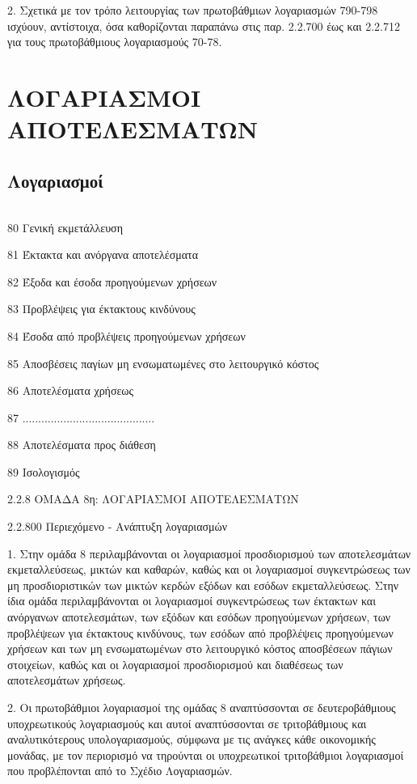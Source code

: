 \documentclass[A4,10pt,greek]{book}
\begin{document}
2. Σχετικά με τον τρόπο λειτουργίας των πρωτοβάθμιων λογαριασμών 790-798 ισχύουν, αντίστοιχα, όσα καθορίζονται παραπάνω στις παρ. 2.2.700 έως και 2.2.712 για τους πρωτοβάθμιους λογαριασμούς 70-78.

\chapter{ΛΟΓΑΡΙΑΣΜΟΙ ΑΠΟΤΕΛΕΣΜΑΤΩΝ}

\section{Λογαριασμοί}

\begin{tabularx}{\linewidth}{lX}

\end{tabularx}

80 Γενική εκμετάλλευση

81 Έκτακτα και ανόργανα αποτελέσματα

82 Έξοδα και έσοδα προηγούμενων χρήσεων

83 Προβλέψεις για έκτακτους κινδύνους

84 Έσοδα από προβλέψεις προηγούμενων χρήσεων

85 Αποσβέσεις παγίων μη ενσωματωμένες στο λειτουργικό κόστος

86 Αποτελέσματα χρήσεως

87 ..........................................

88 Αποτελέσματα προς διάθεση

89 Ισολογισμός  

2.2.8 ΟΜΑΔΑ 8η: ΛΟΓΑΡΙΑΣΜΟΙ ΑΠΟΤΕΛΕΣΜΑΤΩΝ

2.2.800 Περιεχόμενο - Ανάπτυξη λογαριασμών

1. Στην ομάδα 8 περιλαμβάνονται οι λογαριασμοί προσδιορισμού των αποτελεσμάτων εκμεταλλεύσεως, μικτών και καθαρών, καθώς και οι λογαριασμοί συγκεντρώσεως των μη προσδιοριστικών των μικτών κερδών εξόδων και εσόδων εκμεταλλεύσεως. Στην ίδια ομάδα περιλαμβάνονται οι λογαριασμοί συγκεντρώσεως των έκτακτων και ανόργανων αποτελεσμάτων, των εξόδων και εσόδων προηγούμενων χρήσεων, των προβλέψεων για έκτακτους κινδύνους, των εσόδων από προβλέψεις προηγούμενων χρήσεων και των μη ενσωματωμένων στο λειτουργικό κόστος αποσβέσεων πάγιων στοιχείων, καθώς και οι λογαριασμοί προσδιορισμού και διαθέσεως των αποτελεσμάτων χρήσεως.

2. Οι πρωτοβάθμιοι λογαριασμοί της ομάδας 8 αναπτύσσονται σε δευτεροβάθμιους υποχρεωτικούς λογαριασμούς και αυτοί αναπτύσσονται σε τριτοβάθμιους και αναλυτικότερους υπολογαριασμούς, σύμφωνα με τις ανάγκες κάθε οικονομικής μονάδας, με τον περιορισμό να τηρούνται οι υποχρεωτικοί τριτοβάθμιοι λογαριασμοί που προβλέπονται από το Σχέδιο Λογαριασμών.
\end{document}
